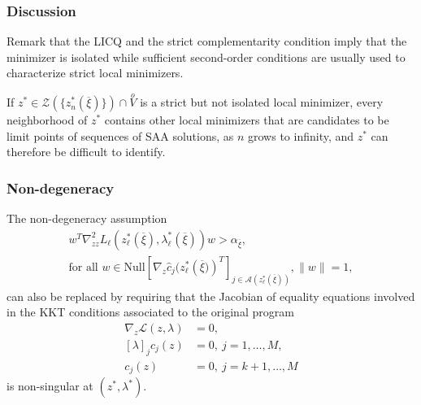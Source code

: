 \documentclass{beamer}
\begin{document}
\begin{frame}
\frametitle{Discussion}

Remark that the LICQ and the strict complementarity condition imply that the minimizer is isolated while sufficient second-order conditions are usually used to characterize strict local minimizers.



\mbox{}

If $z^* \in\mathcal{Z} \left(\lbrace z^*_n(\overline{\xi})\rbrace\right)
\cap \overset{o}{V}$ is a strict but not isolated local minimizer, every neighborhood of $z^*$ contains other local minimizers that are candidates to be limit points of sequences of SAA solutions, as $n$ grows to infinity, and $z^*$ can therefore be difficult to identify.

\end{frame}

\begin{frame}
\frametitle{Non-degeneracy}

The non-degeneracy assumption
\begin{multline*}
w^T \nabla_{zz}^2 L_{\ell} \left(z^*_{\ell}(\overline{\xi}),
\lambda^*_{\ell}(\overline{\xi}) \right) w > \alpha_{\overline{\xi}}, \\
\text{for all }w \in
\text{Null}\left[\nabla_z \hat{c}_j(z^*_{\ell} \left( \overline{\xi})
  \right)^T \right]_{j \in \mathcal{A} (z^*_{\ell}(\overline{\xi})) },
 \|w\|=1,
\label{eq:nondegeneracy}
\end{multline*}
can also be replaced by requiring that the Jacobian of equality equations involved in the KKT conditions associated to the original program
\begin{align*}
\nabla_z \mathcal{L}(z, \lambda) & = 0,\\
[\lambda]_j c_j(z) & = 0,\ j = 1,\ldots,M,\\
c_j(z) & = 0,\ j = k+1,\ldots,M
\end{align*}
is non-singular at $(z^*, \lambda^*)$.

\end{frame}
\end{document}
